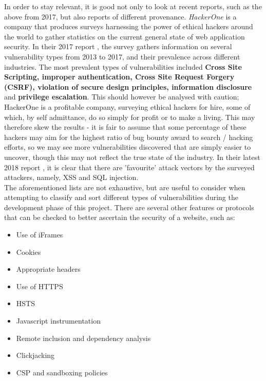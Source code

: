 	In order to stay relevant, it is good not only to look at recent reports, such as the above from 2017, but also reports of different provenance. \emph{HackerOne} is a company that produces surveys harnessing the power of ethical hackers around the world to gather statistics on the current general state of web application security. In their 2017 report \cite{hackerone2017}, the survey gathers information on several vulnerability types from 2013 to 2017, and their prevalence across different industries. The most prevalent types of vulnerabilities included \textbf{Cross Site Scripting, improper authentication, Cross Site Request Forgery (CSRF), violation of secure design principles, information disclosure}  and \textbf{privilege escalation}. This should however be analysed with caution; HackerOne is a profitable company, surveying ethical hackers for hire, some of which, by self admittance, do so simply for profit or to make a living. This may therefore skew the results - it is fair to assume that some percentage of these hackers may aim for the highest ratio of bug bounty award to search / hacking efforts, so we may see more vulnerabilities discovered that are simply easier to uncover, though this may not reflect the true state of the industry. In their latest 2018 report \cite{hackerone2018}, it is clear that there are 'favourite' attack vectors by the surveyed attackers, namely, XSS and SQL injection. \\

	The aforementioned lists are not exhaustive, but are useful to consider when attempting to classify and sort different types of vulnerabilities during the development phase of this project.  There are several other features or protocols that can be checked to better ascertain the security of a website, such as:
\begin{multicols}{2}
	\begin{itemize}
	\item   Use of iFrames
	\item 	Cookies
	\item 	Appropriate headers
	\item 	Use of HTTPS
	\item   HSTS
	\item 	Javascript instrumentation
	\item 	Remote inclusion and dependency analysis
	\item 	Clickjacking
	\item 	CSP and sandboxing policies
	\end{itemize}
\end{multicols}



